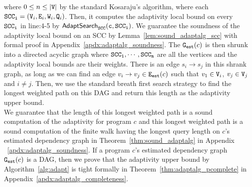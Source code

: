     where $0 \leq n \leq |\mathtt{V}|$ by the standard Kosaraju’s algorithm, where each
    $\mathtt{SCC_i} = (\mathtt{V}_i, \mathtt{E}_i, \mathtt{W}_i, \mathtt{Q}_i)$.
    Then, 
    it computes the adaptivity local bound on every $\mathtt{SCC_i}$
    in line:4-5 by $\mathtt{\mathsf{AdaptSearch}_{SCC}(c, SCC_i)}$.
    We guarantee the soundness of the adaptivity local bound on an SCC by Lemma~\ref{lem:sound_adaptalg_scc} with formal proof in Appendix~\ref{apdx:adaptalg_soundness}.
    The $\mathtt{{G_{est}}}(c)$ is then shrunk into a directed acyclic graph where 
    $\mathtt{SCC_1}, \cdots, \mathtt{SCC_n}$ are all the vertices and the adaptivity local bounds are their weights.
    There is an edge $s_i \to s_j$ in this shrank graph, as long as we can find an edge $v_i \to v_j \in \mathtt{{E_{est}}}(c)$ such that $v_1 \in \mathtt{V}_i$, $v_j \in \mathtt{V}_j$ and $i \neq j$.
    Then, we use the standard breath first search strategy to find the longest weighted path
    on this DAG and return this length as the adaptivity upper bound.
    \\
    We guarantee that 
    the length of this longest weighted path is a sound computation of the adaptivity for program $c$
    and this longest weighted path is a sound computation of the finite walk having the longest query length 
    on $c$'s estimated dependency graph in Theorem~\ref{thm:sound_adaptalg}
    in Appendix
    ~\ref{apdx:adaptalg_soundness}.
If a program
$c$'s estimated dependency graph $\mathtt{{G_{est}}}(c)$ is a DAG, then we prove that the adaptivity upper bound by Algorithm~\ref{alg:adapt} is tight formally in Theorem~\ref{thm:adaptalg_pcomplete} in Appendix~\ref{apdx:adaptalg_completeness}.

